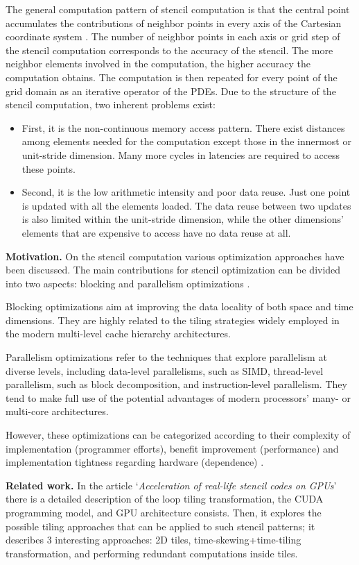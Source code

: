 \documentclass[conference]{IEEEtran}
\newcommand{\mypar}[1]{{\bf #1.}}
\begin{document}
The general computation pattern of stencil computation is that the central point accumulates the contributions of neighbor points in every axis of the Cartesian coordinate system \cite{su-zhang-mei}. The number of neighbor points in each axis or grid step of the stencil computation corresponds to the accuracy of the stencil. The more neighbor elements involved in the computation, the higher accuracy the computation obtains. The computation is then repeated for every point of the grid domain as an iterative operator of the PDEs. Due to the structure of the stencil computation, two inherent problems exist:
\begin{itemize}
	\item First, it is the non-continuous memory access pattern. There exist distances among elements needed for the computation except those in the innermost or unit-stride dimension. Many more cycles in latencies are required to access these points. 
	\item Second, it is the low arithmetic intensity and poor data reuse. Just one point is updated with all the elements loaded. The data reuse between two updates is also limited within the unit-stride dimension, while the other dimensions' elements that are expensive to access have no data reuse at all.
\end{itemize}


\mypar{Motivation} 
On the stencil computation various optimization approaches have been discussed. The main contributions for stencil optimization can be divided into two aspects: blocking and parallelism optimizations \cite{su-zhang-mei}.

Blocking optimizations aim at improving the data locality of both space and time dimensions. They are highly related to the tiling strategies widely employed in the modern multi-level cache hierarchy architectures.
 
Parallelism optimizations refer to the techniques that explore parallelism at diverse levels, including data-level parallelisms, such as SIMD, thread-level parallelism, such as block decomposition, and instruction-level parallelism. They tend to make full use of the potential advantages of modern processors' many- or multi-core architectures. 

However, these optimizations can be categorized according to their complexity of implementation (programmer efforts), benefit improvement (performance) and implementation tightness regarding hardware (dependence) \cite{cruz}.

\mypar{Related work} 
In the article `\textit{Acceleration of real-life stencil codes on GPUs}' \cite{barigou} there is a detailed description of the loop tiling transformation, the CUDA programming model, and GPU architecture consists. Then, it explores the possible tiling approaches that can be applied to such stencil patterns; it describes 3 interesting approaches: 2D tiles, time-skewing+time-tiling transformation, and performing redundant computations inside tiles.
\end{document}
